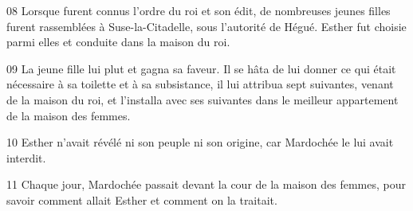 
08 Lorsque furent connus l’ordre du roi et son édit, de nombreuses jeunes filles furent rassemblées à Suse-la-Citadelle, sous l’autorité de Hégué. Esther fut choisie parmi elles et conduite dans la maison du roi.

09 La jeune fille lui plut et gagna sa faveur. Il se hâta de lui donner ce qui était nécessaire à sa toilette et à sa subsistance, il lui attribua sept suivantes, venant de la maison du roi, et l’installa avec ses suivantes dans le meilleur appartement de la maison des femmes.

10 Esther n’avait révélé ni son peuple ni son origine, car Mardochée le lui avait interdit.

11 Chaque jour, Mardochée passait devant la cour de la maison des femmes, pour savoir comment allait Esther et comment on la traitait.

